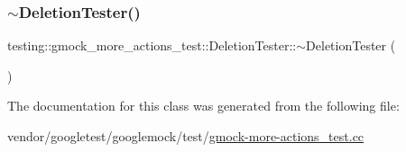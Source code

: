 \mbox{\label{classtesting_1_1gmock__more__actions__test_1_1_deletion_tester_ac79602dcb18df1747b086d7118e7e5f7}} 
\subsubsection{\texorpdfstring{$\sim$\+Deletion\+Tester()}{~DeletionTester()}}
{\footnotesize\ttfamily testing\+::gmock\+\_\+more\+\_\+actions\+\_\+test\+::\+Deletion\+Tester\+::$\sim$\+Deletion\+Tester (\begin{DoxyParamCaption}{ }\end{DoxyParamCaption})\hspace{0.3cm}{\ttfamily [inline]}}



The documentation for this class was generated from the following file\+:\begin{DoxyCompactItemize}
\item 
vendor/googletest/googlemock/test/\hyperlink{gmock-more-actions__test_8cc}{gmock-\/more-\/actions\+\_\+test.\+cc}\end{DoxyCompactItemize}

